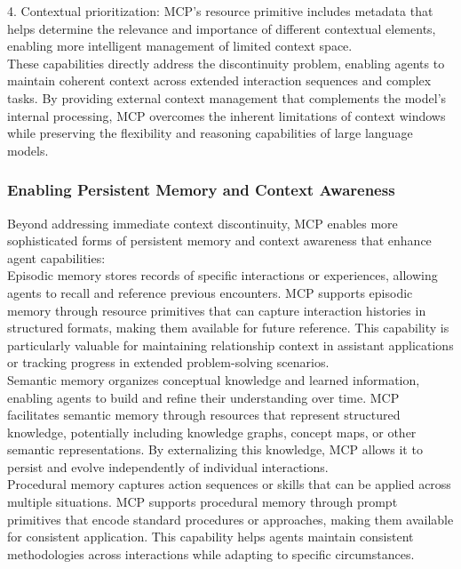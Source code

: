 4. Contextual prioritization: MCP's resource primitive includes metadata that helps determine the relevance and importance of different contextual elements, enabling more intelligent management of limited context space.\\ \newline
These capabilities directly address the discontinuity problem, enabling agents to maintain coherent context across extended interaction sequences and complex tasks. By providing external context management that complements the model's internal processing, MCP overcomes the inherent limitations of context windows while preserving the flexibility and reasoning capabilities of large language models.\\
\subsubsection{Enabling Persistent Memory and Context Awareness}
Beyond addressing immediate context discontinuity, MCP enables more sophisticated forms of persistent memory and context awareness that enhance agent capabilities:\\ \newline
Episodic memory stores records of specific interactions or experiences, allowing agents to recall and reference previous encounters. MCP supports episodic memory through resource primitives that can capture interaction histories in structured formats, making them available for future reference. This capability is particularly valuable for maintaining relationship context in assistant applications or tracking progress in extended problem-solving scenarios.\\ \newline
Semantic memory organizes conceptual knowledge and learned information, enabling agents to build and refine their understanding over time. MCP facilitates semantic memory through resources that represent structured knowledge, potentially including knowledge graphs, concept maps, or other semantic representations. By externalizing this knowledge, MCP allows it to persist and evolve independently of individual interactions.\\ \newline
Procedural memory captures action sequences or skills that can be applied across multiple situations. MCP supports procedural memory through prompt primitives that encode standard procedures or approaches, making them available for consistent application. This capability helps agents maintain consistent methodologies across interactions while adapting to specific circumstances.\\ \newline
